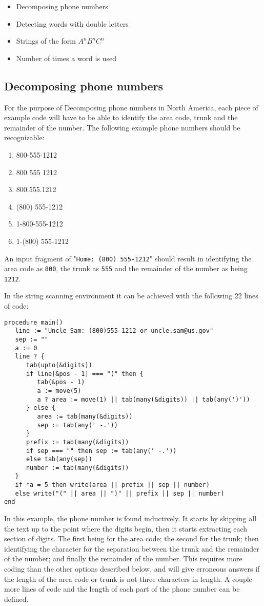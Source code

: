 \documentclass{article}
\begin{document}
\begin{itemize}
\item Decomposing phone numbers
\item Detecting words with double letters
\item Strings of the form \emph{$A^nB^nC^n$}
\item Number of times a word is used
\end{itemize}

\subsection{Decomposing phone numbers}
For the purpose of Decomposing phone numbers in North America, each piece of example code will have to be able to identify the area code, trunk and the remainder of the number.  The following example phone numbers should be recognizable:

\begin{enumerate}
\item 800-555-1212
\item 800 555 1212
\item 800.555.1212
\item (800) 555-1212
\item 1-800-555-1212
\item 1-(800) 555-1212
\end{enumerate}

An input fragment of "\texttt{Home: (800) 555-1212}" should result in identifying the area code as \texttt{800}, the trunk as \texttt{555} and the remainder of the number as being \texttt{1212}.

In the string scanning environment it can be achieved with the following 22 lines of code:
\begin{verbatim}
procedure main()
   line := "Uncle Sam: (800)555-1212 or uncle.sam@us.gov"
   sep := ""
   a := 0
   line ? {
      tab(upto(&digits))
      if line[&pos - 1] === "(" then {
         tab(&pos - 1)
         a := move(5)
         a ? area := move(1) || tab(many(&digits)) || tab(any(')'))
      } else {
         area := tab(many(&digits))
         sep := tab(any(' -.'))
      } 
      prefix := tab(many(&digits))
      if sep === "" then sep := tab(any(' -.'))
      else tab(any(sep))
      number := tab(many(&digits))
   }
   if *a = 5 then write(area || prefix || sep || number)
   else write("(" || area || ")" || prefix || sep || number)
end
\end{verbatim}
In this example, the phone number is found inductively.  It starts by skipping all the text up to the point where the digits begin, then it starts extracting each section of digits.  The first being for the area code; the second for the trunk; then identifying the character for the separation between the trunk and the remainder of the number; and finally the remainder of the number.  This requires more coding than the other options described below, and will give erroneous answers if the length of the area code or trunk is not three characters in length.  A couple more lines of code and the length of each part of the phone number can be defined.
\end{document}

